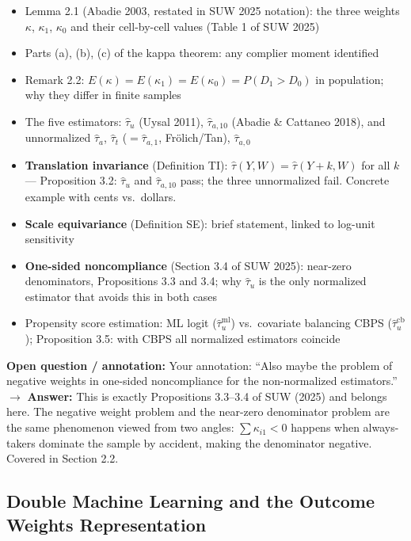 \documentclass[12pt, a4paper]{article}
\newenvironment{openbox}{%
  \begin{mdframed}[backgroundcolor=greenbg,linecolor=notegreen,linewidth=1pt]%
  \textbf{\color{notegreen}Open question / annotation:} }{%
  \end{mdframed}}
\begin{document}
\begin{itemize}
  \item Lemma 2.1 (Abadie 2003, restated in SUW 2025 notation): the three weights $\kappa$, $\kappa_1$, $\kappa_0$ and their cell-by-cell values (Table 1 of SUW 2025)
  \item Parts (a), (b), (c) of the kappa theorem: any complier moment identified
  \item Remark 2.2: $E(\kappa) = E(\kappa_1) = E(\kappa_0) = P(D_1 > D_0)$ in population; why they differ in finite samples
  \item The five estimators: $\hat\tau_u$ (Uysal 2011), $\hat\tau_{a,10}$ (Abadie \& Cattaneo 2018), and unnormalized $\hat\tau_a$, $\hat\tau_t$ ($= \hat\tau_{a,1}$, Frölich/Tan), $\hat\tau_{a,0}$
  \item \textbf{Translation invariance} (Definition TI): $\hat\tau(Y, W) = \hat\tau(Y+k, W)$ for all $k$ --- Proposition 3.2: $\hat\tau_u$ and $\hat\tau_{a,10}$ pass; the three unnormalized fail. Concrete example with cents vs.\ dollars.
  \item \textbf{Scale equivariance} (Definition SE): brief statement, linked to log-unit sensitivity
  \item \textbf{One-sided noncompliance} (Section 3.4 of SUW 2025): near-zero denominators, Propositions 3.3 and 3.4; why $\hat\tau_u$ is the only normalized estimator that avoids this in both cases
  \item Propensity score estimation: ML logit ($\hat\tau_u^{\text{ml}}$) vs.\ covariate balancing CBPS ($\hat\tau_u^{\text{cb}}$); Proposition 3.5: with CBPS all normalized estimators coincide
\end{itemize}

\begin{openbox}
Your annotation: ``Also maybe the problem of negative weights in one-sided noncompliance for the non-normalized estimators.'' $\to$ \textbf{Answer:} This is exactly Propositions 3.3--3.4 of SUW (2025) and belongs here. The negative weight problem and the near-zero denominator problem are the same phenomenon viewed from two angles: $\sum \kappa_{i1} < 0$ happens when always-takers dominate the sample by accident, making the denominator negative. Covered in Section 2.2.
\end{openbox}

\subsection{Double Machine Learning and the Outcome Weights Representation}
\end{document}
